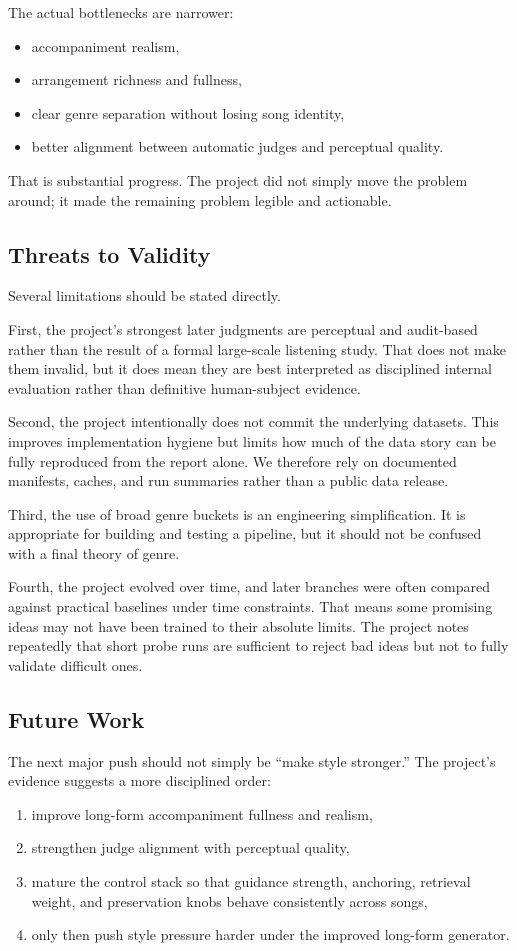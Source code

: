 \documentclass[conference]{IEEEtran}
\begin{document}
The actual bottlenecks are narrower:
\begin{itemize}[leftmargin=1.5em]
    \item accompaniment realism,
    \item arrangement richness and fullness,
    \item clear genre separation without losing song identity,
    \item better alignment between automatic judges and perceptual quality.
\end{itemize}

That is substantial progress. The project did not simply move the problem around; it made the remaining problem legible and actionable.

\subsection{Threats to Validity}
Several limitations should be stated directly.

First, the project's strongest later judgments are perceptual and audit-based rather than the result of a formal large-scale listening study. That does not make them invalid, but it does mean they are best interpreted as disciplined internal evaluation rather than definitive human-subject evidence.

Second, the project intentionally does not commit the underlying datasets. This improves implementation hygiene but limits how much of the data story can be fully reproduced from the report alone. We therefore rely on documented manifests, caches, and run summaries rather than a public data release.

Third, the use of broad genre buckets is an engineering simplification. It is appropriate for building and testing a pipeline, but it should not be confused with a final theory of genre.

Fourth, the project evolved over time, and later branches were often compared against practical baselines under time constraints. That means some promising ideas may not have been trained to their absolute limits. The project notes repeatedly that short probe runs are sufficient to reject bad ideas but not to fully validate difficult ones.

\subsection{Future Work}
The next major push should not simply be ``make style stronger.'' The project's evidence suggests a more disciplined order:
\begin{enumerate}[leftmargin=1.5em]
    \item improve long-form accompaniment fullness and realism,
    \item strengthen judge alignment with perceptual quality,
    \item mature the control stack so that guidance strength, anchoring, retrieval weight, and preservation knobs behave consistently across songs,
    \item only then push style pressure harder under the improved long-form generator.
\end{enumerate}
\end{document}
